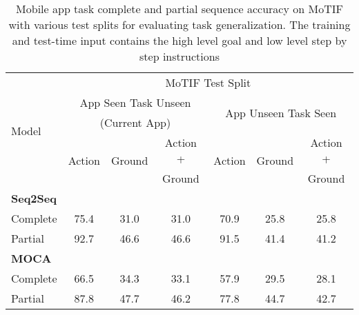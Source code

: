 \begin{table}[t]
    \centering
          \renewcommand\arraystretch{0.95}

        \caption{Mobile app task complete and partial sequence accuracy on MoTIF with various test splits for evaluating task generalization. The training and test-time input contains the high level goal and low level step by step instructions }
    \begin{tabular}{|l|c|c|c|c|c|c|}
    \hline
   \multirow{5}{*}{Model} & \multicolumn{6}{c|}{MoTIF Test Split}\\
    \cline{2-7}
      & \multicolumn{3}{c|}{App Seen Task Unseen} & \multicolumn{3}{c|}{\multirow{2}{*}{App Unseen Task Seen}}\\
      & \multicolumn{3}{c|}{(Current App)} & \multicolumn{3}{c|}{}\\
    \cline{2-7}
  & \multirow{2}{*}{Action} & \multirow{2}{*}{Ground} & Action + &  \multirow{2}{*}{Action} & \multirow{2}{*}{Ground} & Action +\\
   & & & Ground& & & Ground\\
    \hline
    \textbf{Seq2Seq} & & & & & & \\
    Complete & 75.4 & 31.0 & 31.0 & 70.9 & 25.8 & 25.8\\
    Partial & 92.7 & 46.6 & 46.6 & 91.5 & 41.4 & 41.2 \\ 
    \hline
    \textbf{MOCA} & & & & & & \\
    Complete & 66.5 & 34.3 & 33.1 & 57.9 & 29.5 & 28.1 \\ 
    Partial & 87.8 & 47.7 & 46.2 & 77.8 & 44.7 & 42.7 \\
    \hline
    \end{tabular}
    \label{tab:task_gen}
\end{table}%

